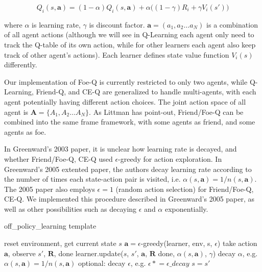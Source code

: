 \documentclass[conference]{IEEEtran}
\newcommand{\asteq}{\mathrel{*}=}
\begin{document}
\begin{equation}
Q_i(s, \mathbf{a}) = (1-\alpha) Q_i(s, \mathbf{a}) + \alpha  \big( (1-\gamma) R_i + \gamma V_i(s') \big)
\label{eq:update}
\end{equation}

where $\alpha$ is learning rate, $\gamma$ is discount factor. $\mathbf{a}=(a_1, a_2\dots a_N)$ is a combination of all agent actions (although we will see in Q-Learning each agent only need to track the Q-table of its own action, while for other learners each agent also keep track of other agent's actions). Each learner defines state value function $V_i(s)$ differently.

Our implementation of Foe-Q is currently restricted to only two agents, while Q-Learning, Friend-Q, and CE-Q are generalized to handle multi-agents, with each agent potentially having different action choices. The joint action space of all agent is $\mathbf{A}=\{A_1, A_2 \dots A_N\}$. As Littman has point-out, Friend/Foe-Q can be combined into the same frame framework, with some agents as friend, and some agents as foe\cite{littman2001friend}.

In Greenward's 2003 paper\cite{greenwald2003correlated}, it is unclear how learning rate is decayed, and whether Friend/Foe-Q, CE-Q used $\epsilon$-greedy for action exploration. In Greenward's 2005 extented paper\cite{greenwald2005correlated}, the authors decay learning rate according to the number of times each state-action pair is visited, i.e. $\alpha(s,\mathbf{a}) = 1/n(s,\mathbf{a})$. The 2005 paper also employs $\epsilon=1$ (random action selection) for Friend/Foe-Q, CE-Q. We implemented this procedure described in Greenward's 2005 paper, as well as other possibilities such as decaying $\epsilon$ and $\alpha$ exponentially.

\begin{algorithm}[h!]
	\caption{off\_policy\_learning template}
	\begin{algorithmic}
				\State reset environment, get current state $s$
					\State $\mathbf{a} = \epsilon$-greedy(learner, env, s, $\epsilon$)
					\State take action $\mathbf{a}$, observe $s'$, $\mathbf{R}$, done
					\State learner.update($s$, $s'$, $\mathbf{a}$, $\mathbf{R}$ done, $\alpha(s,\mathbf{a})$, $\gamma$)
				    \State decay $\alpha$, e.g. $\alpha(s,\mathbf{a}) = 1/n(s,\mathbf{a})$
				    \State optional: decay $\epsilon$, e.g. $\epsilon \asteq \epsilon\_decay$
				    \State $s=s'$
				\EndFor			
			\EndFor
		\EndFunction
	\end{algorithmic}
	\label{algo:learning}
\end{algorithm}
\end{document}
